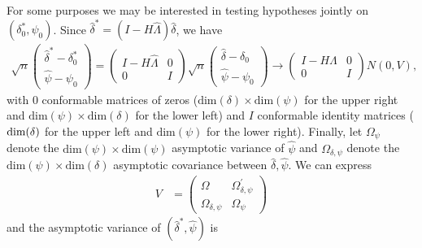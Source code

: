 \documentclass[bib]{./sty/statapress}
\begin{document}
For some purposes we may be interested in testing hypotheses jointly on $\left(\delta_{0}^{*},\psi_{0}\right)$.
Since $\widehat{\delta}^{*}=(I-H\widehat{\Lambda})\widehat{\delta}$, we have
\begin{align*}
\sqrt{n}\begin{pmatrix}\widehat{\delta}^{*}-\delta_{0}^{*}\\
\widehat{\psi}-\psi_{0}
\end{pmatrix}=\begin{pmatrix}I-H\widehat{\Lambda} & 0\\
0 & I
\end{pmatrix}\sqrt{n}\begin{pmatrix}\widehat{\delta}-\delta_{0}\\
\widehat{\psi}-\psi_{0}
\end{pmatrix}\to\begin{pmatrix}I-H\Lambda & 0\\
0 & I
\end{pmatrix}N(0,V),
\end{align*}
with $0$ conformable matrices of zeros ($\text{dim}(\delta)\times\text{dim}(\psi)$
for the upper right and $\text{dim}(\psi)\times\text{dim}(\delta)$
for the lower left) and $I$ conformable identity matrices ($\text{dim\ensuremath{\left(\delta\right)}}$
for the upper left and $\text{dim}\left(\psi\right)$ for the lower
right). Finally, let $\Omega_{\psi}$ denote the $\text{dim}(\psi)\times\text{dim}(\psi)$
asymptotic variance of $\widehat{\psi}$ and $\Omega_{\delta,\psi}$
denote the $\text{dim}(\psi)\times\text{dim}(\delta)$ asymptotic
covariance between $\widehat{\delta},\widehat{\psi}$. We can express
\begin{align*}
V & =\begin{pmatrix}\Omega & \Omega_{\delta,\psi}^{\prime}\\
\Omega_{\delta,\psi} & \Omega_{\psi}
\end{pmatrix}
\end{align*}
and the asymptotic variance of $\left(\hat{\delta}^{*},\hat{\psi}\right)$ is
\end{document}
